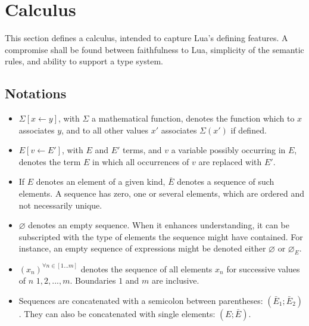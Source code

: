 
\section{Calculus}

This section defines a calculus, intended to capture Lua's defining
features. A compromise shall be found between faithfulness to Lua,
simplicity of the semantic rules, and ability to support a type
system.

\subsection{Notations}
\begin{itemize}

\item
  $\Sigma[x\leftarrow y]$, with $\Sigma$ a mathematical function,
  denotes the function which to $x$ associates $y$, and to all other
  values $x'$ associates $\Sigma(x')$ if defined.

\item
  $E[v\leftarrow E']$, with $E$ and $E'$ terms, and $v$ a variable
  possibly occurring in $E$, denotes the term $E$ in which all
  occurrences of $v$ are replaced with $E'$.

\item
  If $E$ denotes an element of a given kind, $\bar E$ denotes a
  sequence of such elements. A sequence has zero, one or several
  elements, which are ordered and not necessarily unique.

\item
  $\varnothing$ denotes an empty sequence. When it enhances
  understanding, it can be subscripted with the type of elements the
  sequence might have contained. For instance, an empty sequence of
  expressions might be denoted either $\varnothing$ or
  $\varnothing_E$.

\item
  $(x_n)^{\forall n\in[1...m]}$ denotes the sequence of all elements
  $x_n$ for successive values of $n$ $1, 2, ..., m$. Boundaries $1$
  and $m$ are inclusive.

\item
  Sequences are concatenated with a semicolon between parentheses:
  $(\bar E_1;\bar E_2)$. They can also be concatenated with single
  elements: $(E; \bar E)$.

\end{itemize}

